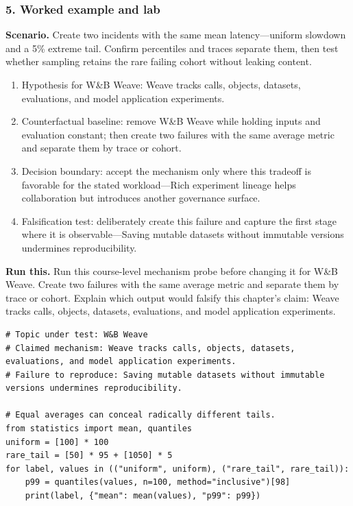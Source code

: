 \subsubsection*{5. Worked example and lab}
\textbf{Scenario.} Create two incidents with the same mean latency—uniform slowdown and a 5\% extreme tail. Confirm percentiles and traces separate them, then test whether sampling retains the rare failing cohort without leaking content.
\begin{enumerate}
\item Hypothesis for W\&B Weave: Weave tracks calls, objects, datasets, evaluations, and model application experiments.
\item Counterfactual baseline: remove W\&B Weave while holding inputs and evaluation constant; then create two failures with the same average metric and separate them by trace or cohort.
\item Decision boundary: accept the mechanism only where this tradeoff is favorable for the stated workload—Rich experiment lineage helps collaboration but introduces another governance surface.
\item Falsification test: deliberately create this failure and capture the first stage where it is observable—Saving mutable datasets without immutable versions undermines reproducibility.
\end{enumerate}
\textbf{Run this.} Run this course-level mechanism probe before changing it for W\&B Weave. Create two failures with the same average metric and separate them by trace or cohort. Explain which output would falsify this chapter's claim: Weave tracks calls, objects, datasets, evaluations, and model application experiments.
\begin{Verbatim}[fontsize=\scriptsize]
# Topic under test: W&B Weave
# Claimed mechanism: Weave tracks calls, objects, datasets, evaluations, and model application experiments.
# Failure to reproduce: Saving mutable datasets without immutable versions undermines reproducibility.

# Equal averages can conceal radically different tails.
from statistics import mean, quantiles
uniform = [100] * 100
rare_tail = [50] * 95 + [1050] * 5
for label, values in (("uniform", uniform), ("rare_tail", rare_tail)):
    p99 = quantiles(values, n=100, method="inclusive")[98]
    print(label, {"mean": mean(values), "p99": p99})
\end{Verbatim}
